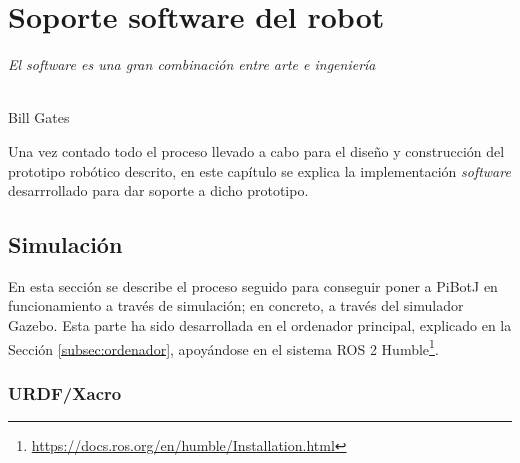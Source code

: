 \chapter{Soporte software del robot}
\label{cap:capitulo6}



\begin{flushright}
\begin{minipage}[]{10cm}
\emph{El software es una gran combinación entre arte e ingeniería}\\
\end{minipage}\\

Bill Gates\\
\end{flushright}

\vspace{1cm}
\setcounter{footnote}{84}

Una vez contado todo el proceso llevado a cabo para el diseño y construcción del prototipo robótico descrito, en este capítulo se explica la implementación \textit{software} desarrrollado para dar soporte a dicho prototipo.

\section{Simulación}
\label{sec:simulacion}

En esta sección se describe el proceso seguido para conseguir poner a PiBotJ en funcionamiento a través de simulación; en concreto, a través del simulador Gazebo. Esta parte ha sido desarrollada en el ordenador principal, explicado en la Sección \ref{subsec:ordenador}, apoyándose en el sistema ROS 2 Humble\footnote{\url{https://docs.ros.org/en/humble/Installation.html}}.



\subsection{URDF/Xacro}
\label{subsec:urdf}

